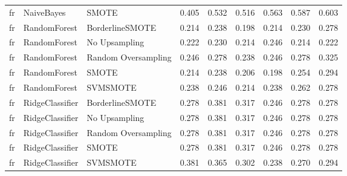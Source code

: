 \begin{tabular}{lllllllll}
      fr &                   NaiveBayes &               SMOTE & 0.405 &                     0.532 &                 0.516 &                  0.563 &                                   0.587 &     0.603 \\
      fr &                 RandomForest &     BorderlineSMOTE & 0.214 &                     0.238 &                 0.198 &                  0.214 &                                   0.230 &     0.278 \\
      fr &                 RandomForest &       No Upsampling & 0.222 &                     0.230 &                 0.214 &                  0.246 &                                   0.214 &     0.222 \\
      fr &                 RandomForest & Random Oversampling & 0.246 &                     0.278 &                 0.238 &                  0.246 &                                   0.278 &     0.325 \\
      fr &                 RandomForest &               SMOTE & 0.214 &                     0.238 &                 0.206 &                  0.198 &                                   0.254 &     0.294 \\
      fr &                 RandomForest &            SVMSMOTE & 0.238 &                     0.246 &                 0.214 &                  0.238 &                                   0.262 &     0.278 \\
      fr &              RidgeClassifier &     BorderlineSMOTE & 0.278 &                     0.381 &                 0.317 &                  0.246 &                                   0.278 &     0.278 \\
      fr &              RidgeClassifier &       No Upsampling & 0.278 &                     0.381 &                 0.317 &                  0.246 &                                   0.278 &     0.278 \\
      fr &              RidgeClassifier & Random Oversampling & 0.278 &                     0.381 &                 0.317 &                  0.246 &                                   0.278 &     0.278 \\
      fr &              RidgeClassifier &               SMOTE & 0.278 &                     0.381 &                 0.317 &                  0.246 &                                   0.278 &     0.278 \\
      fr &              RidgeClassifier &            SVMSMOTE & 0.381 &                     0.365 &                 0.302 &                  0.238 &                                   0.270 &     0.294 \\

\end{tabular}
